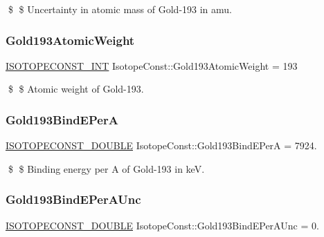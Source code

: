 \$ \$ Uncertainty in atomic mass of Gold-\/193 in amu. \mbox{\label{group___isotope_const-_gold-_au193_gac4746add5e0c0b0ef5fca905ab68be13}} 
\subsubsection{\texorpdfstring{Gold193\+Atomic\+Weight}{Gold193AtomicWeight}}
{\footnotesize\ttfamily \mbox{\hyperlink{group___isotope_const-_macros_ga5f18360b3e99483a35c32d789e62621c}{I\+S\+O\+T\+O\+P\+E\+C\+O\+N\+S\+T\+\_\+\+I\+NT}} Isotope\+Const\+::\+Gold193\+Atomic\+Weight = 193}

\$ \$ Atomic weight of Gold-\/193. \mbox{\label{group___isotope_const-_gold-_au193_gaa7ae3b85cabef3f0eac2685526d32bee}} 
\subsubsection{\texorpdfstring{Gold193\+Bind\+E\+PerA}{Gold193BindEPerA}}
{\footnotesize\ttfamily \mbox{\hyperlink{group___isotope_const-_macros_ga8f45a7272ce02c0b4c65c44636ed719a}{I\+S\+O\+T\+O\+P\+E\+C\+O\+N\+S\+T\+\_\+\+D\+O\+U\+B\+LE}} Isotope\+Const\+::\+Gold193\+Bind\+E\+PerA = 7924.}

\$ \$ Binding energy per A of Gold-\/193 in keV. \mbox{\label{group___isotope_const-_gold-_au193_gaa5ccc277d1e214367cb93ad0c2c9d226}} 
\subsubsection{\texorpdfstring{Gold193\+Bind\+E\+Per\+A\+Unc}{Gold193BindEPerAUnc}}
{\footnotesize\ttfamily \mbox{\hyperlink{group___isotope_const-_macros_ga8f45a7272ce02c0b4c65c44636ed719a}{I\+S\+O\+T\+O\+P\+E\+C\+O\+N\+S\+T\+\_\+\+D\+O\+U\+B\+LE}} Isotope\+Const\+::\+Gold193\+Bind\+E\+Per\+A\+Unc = 0.}


